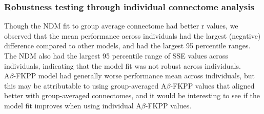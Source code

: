 
\subsubsection{Robustness testing through individual connectome analysis}
Though the NDM fit to group average connectome had better r values, we observed that the mean performance across individuals had the largest (negative) difference compared to other models, and had the largest 95 percentile ranges. The NDM also had the largest 95 percentile range of SSE values across individuals, indicating that the model fit was not robust across individuals.\\ 

A$\beta$-FKPP model had generally worse performance mean across individuals, but this may be attributable to using group-averaged A$\beta$-FKPP values that aligned better with group-averaged connectomes, and it would be interesting to see if the model fit improves when using individual A$\beta$-FKPP values.


